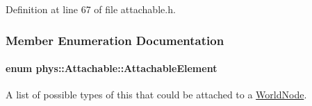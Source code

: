 Definition at line 67 of file attachable.h.



\subsubsection{Member Enumeration Documentation}
\hypertarget{classphys_1_1Attachable_acd1fca033e7cc0bb3024a92d466d213a}{
\paragraph[{AttachableElement}]{\setlength{\rightskip}{0pt plus 5cm}enum {\bf phys::Attachable::AttachableElement}}\hfill}
\label{classphys_1_1Attachable_acd1fca033e7cc0bb3024a92d466d213a}


A list of possible types of this that could be attached to a \hyperlink{classphys_1_1WorldNode}{WorldNode}. 

